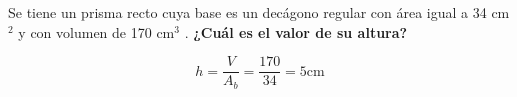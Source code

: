 Se tiene un prisma recto cuya base es un decágono regular con área igual a 34 cm$^2$ y con volumen de 170 cm$^3$ . \textbf{¿Cuál es el valor de su altura?}

\begin{solutionbox}{2cm}
    \[h=\dfrac{V}{A_b}=\dfrac{170}{34}=5 \text{cm}\]
\end{solutionbox}
